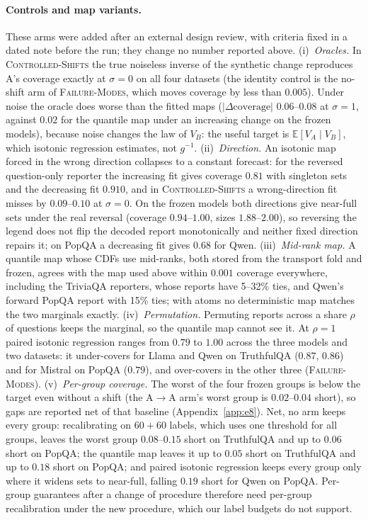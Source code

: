 \documentclass[twoside]{article}
\theoremstyle{definition}
\theoremstyle{remark}
\newcommand{\E}{\mathbb{E}}
\newcommand{\1}{\mathbf{1}}
\newcommand{\expname}[1]{\textsc{#1}}
\begin{document}
\paragraph{Controls and map variants.} These arms were added after an external design review, with
criteria fixed in a dated note before the run; they change no number reported above.
(i)~\emph{Oracles.} In \expname{Controlled-Shifts} the true noiseless inverse of the synthetic change reproduces
A's coverage exactly at $\sigma=0$ on all four datasets (the identity control is the no-shift arm of
\expname{Failure-Modes}, which moves coverage by less than $0.005$). Under noise the oracle does worse than the
fitted maps ($|\Delta\text{coverage}|$ $0.06$--$0.08$ at $\sigma=1$, against $0.02$ for the quantile map under
an increasing change on the frozen models), because noise changes the law of $V_B$: the useful target is
$\E[V_A\mid V_B]$, which isotonic regression estimates, not $g^{-1}$.
(ii)~\emph{Direction.} An isotonic map forced in the wrong direction collapses to a constant forecast:
for the reversed question-only reporter the increasing fit gives coverage $0.81$ with singleton sets
and the decreasing fit $0.910$, and in \expname{Controlled-Shifts} a wrong-direction fit misses by $0.09$--$0.10$ at
$\sigma=0$. On the frozen models both directions give near-full sets under the real reversal (coverage
$0.94$--$1.00$, sizes $1.88$--$2.00$), so reversing the legend does not flip the decoded report
monotonically and neither fixed direction repairs it; on PopQA a decreasing fit gives $0.68$ for Qwen.
(iii)~\emph{Mid-rank map.} A quantile map whose CDFs use mid-ranks, both stored from the transport fold
and frozen, agrees with the map used above within $0.001$ coverage everywhere, including the TriviaQA
reporters, whose reports have 5--32\% ties, and Qwen's forward PopQA report with 15\% ties; with atoms
no deterministic map matches the two marginals exactly.
(iv)~\emph{Permutation.} Permuting reports across a share $\rho$ of questions keeps the marginal, so the
quantile map cannot see it. At $\rho=1$ paired isotonic regression ranges from $0.79$ to $1.00$ across the
three models and two datasets: it under-covers for Llama and Qwen on TruthfulQA ($0.87$, $0.86$) and for
Mistral on PopQA ($0.79$), and over-covers in the other three (\expname{Failure-Modes}).
(v)~\emph{Per-group coverage.} The worst of the four frozen groups is below the target even without a shift
(the A$\to$A arm's worst group is $0.02$--$0.04$ short), so gaps are reported net of that baseline
(Appendix~\ref{app:e8}). Net, no arm keeps every group: recalibrating on $60{+}60$ labels, which uses one
threshold for all groups, leaves the worst group $0.08$--$0.15$ short on TruthfulQA and up to $0.06$ short on
PopQA; the quantile map leaves it up to $0.05$ short on TruthfulQA and up to $0.18$ short on PopQA; and
paired isotonic regression keeps every group only where it widens sets to near-full, falling $0.19$ short for
Qwen on PopQA. Per-group guarantees after a change of procedure therefore need per-group recalibration
under the new procedure, which our label budgets do not support.
\end{document}
